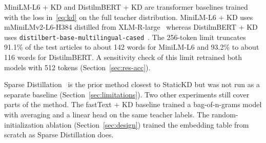 \documentclass{ieeeaccess}
\begin{document}
MiniLM-L6 + KD and DistilmBERT + KD are transformer baselines trained with the loss in~\eqref{eq:kd} on the full teacher distribution. MiniLM-L6 + KD uses mMiniLMv2-L6-H384 distilled from XLM-R-large~\cite{wang2021minilmv2} whereas DistilmBERT + KD uses \texttt{distilbert-base-multilingual-cased}~\cite{sanh2019distilbert}. The 256-token limit truncates 91.1\% of the test articles to about 142 words for MiniLM-L6 and 93.2\% to about 116 words for DistilmBERT. A sensitivity check of this limit retrained both models with 512 tokens (Section~\ref{sec:res-acc}).

Sparse Distillation~\cite{ye2022sparse} is the prior method closest to StaticKD but was not run as a separate baseline (Section~\ref{sec:limitations}). Two other experiments still cover parts of the method. The fastText + KD baseline trained a bag-of-n-grams model with averaging and a linear head on the same teacher labels. The random-initialization ablation (Section~\ref{sec:design}) trained the embedding table from scratch as Sparse Distillation does.

\begin{table}[!t]
\caption{Baselines and Their Training}
\label{tab:baselines}
\centering
\footnotesize
\setlength{\tabcolsep}{4pt}
\end{table}
\end{document}
